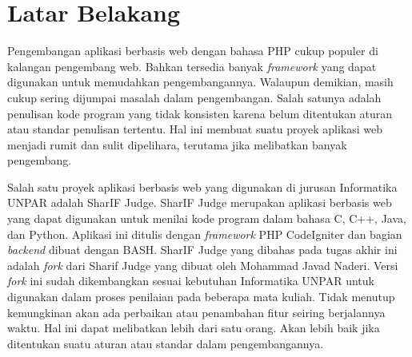 \documentclass[a4paper,twoside]{article}
\begin{document}
	\section{Latar Belakang}
	Pengembangan aplikasi berbasis web dengan bahasa PHP cukup populer di kalangan pengembang web. Bahkan tersedia banyak \textit{framework} yang dapat digunakan untuk memudahkan pengembangannya. Walaupun demikian, masih cukup sering dijumpai masalah dalam pengembangan. Salah satunya adalah penulisan kode program yang tidak konsisten karena belum ditentukan aturan atau standar penulisan tertentu. Hal ini membuat suatu proyek aplikasi web menjadi rumit dan sulit dipelihara, terutama jika melibatkan banyak pengembang. 
	
	Salah satu proyek aplikasi berbasis web yang digunakan di jurusan Informatika UNPAR adalah SharIF Judge. SharIF Judge merupakan aplikasi berbasis web yang dapat digunakan untuk menilai kode program dalam bahasa C, C++, Java, dan Python. Aplikasi ini ditulis dengan  \textit{framework} PHP CodeIgniter dan bagian \textit{backend} dibuat dengan BASH. SharIF Judge yang dibahas pada tugas akhir ini adalah \textit{fork} dari Sharif Judge yang dibuat oleh Mohammad Javad Naderi. Versi \textit{fork} ini sudah dikembangkan sesuai kebutuhan Informatika UNPAR untuk digunakan dalam proses penilaian pada beberapa mata kuliah. Tidak menutup kemungkinan akan ada perbaikan atau penambahan fitur seiring berjalannya waktu. Hal ini dapat melibatkan lebih dari satu orang. Akan lebih baik jika ditentukan suatu aturan atau standar dalam pengembangannya.
	
\end{document}
